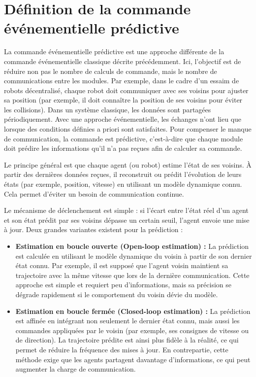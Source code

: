 \section{Définition de la commande événementielle prédictive}
\label{sec:cmd_pred}

La commande événementielle prédictive \cite{ding_overview_2018, aranda-escolastico_event-based_2020} est une approche différente de la commande événementielle classique décrite précédemment. Ici, l'objectif est de réduire non pas le nombre de calculs de commande, mais le nombre de communications entre les modules. Par exemple, dans le cadre d'un essaim de robots décentralisé, chaque robot doit communiquer avec ses voisins pour ajuster sa position (par exemple, il doit connaître la position de ses voisins pour éviter les collisions). Dans un système classique, les données sont partagées périodiquement. Avec une approche événementielle, les échanges n’ont lieu que lorsque des conditions définies a priori sont satisfaites. Pour compenser le manque de communication, la commande est prédictive, c'est-à-dire que chaque module doit prédire les informations qu'il n'a pas reçues afin de calculer sa commande.

Le principe général est que chaque agent (ou robot) estime l'état de ses voisins. À partir des dernières données reçues, il reconstruit ou prédit l’évolution de leurs états (par exemple, position, vitesse) en utilisant un modèle dynamique connu. Cela permet d’éviter un besoin de communication continue.

Le mécanisme de déclenchement est simple : si l’écart entre l’état réel d’un agent et son état prédit par ses voisins dépasse un certain seuil, l’agent envoie une mise à jour.
Deux grandes variantes existent pour la prédiction :
\begin{itemize}
  \item \textbf{Estimation en boucle ouverte (Open-loop estimation) :} La prédiction est calculée en utilisant le modèle dynamique du voisin à partir de son dernier état connu. Par exemple, il est supposé que l'agent voisin maintient sa trajectoire avec la même vitesse que lors de la dernière communication. Cette approche est simple et requiert peu d'informations, mais sa précision se dégrade rapidement si le comportement du voisin dévie du modèle.
  
  \item \textbf{Estimation en boucle fermée (Closed-loop estimation) :} La prédiction est affinée en intégrant non seulement le dernier état connu, mais aussi les commandes appliquées par le voisin (par exemple, ses consignes de vitesse ou de direction). La trajectoire prédite est ainsi plus fidèle à la réalité, ce qui permet de réduire la fréquence des mises à jour. En contrepartie, cette méthode exige que les agents partagent davantage d'informations, ce qui peut augmenter la charge de communication.
\end{itemize}

